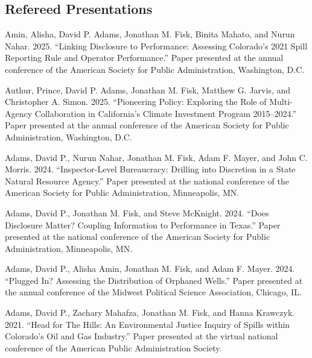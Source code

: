 \documentclass[12pt,letterpaper]{article}
\renewenvironment{itemize}{
  \begin{list}{}{
    \setlength{\leftmargin}{1.5em}
    \setlength{\itemsep}{0.25em}
    \setlength{\parskip}{0pt}
    \setlength{\parsep}{0.25em}
  }
}{
  \end{list}
}
\begin{document}
\subsection*{Refereed Presentations}
	\begin{itemize}\leftmargin=2pt\itemindent=-15pt\leftmargin=2pt\itemindent=-15pt

    \item Amin, Alisha, David P. Adams, Jonathan M. Fisk, Binita Mahato, and Nurun Nahar. 2025. ``Linking Disclosure to Performance: Assessing Colorado's 2021 Spill Reporting Rule and Operator Performance.'' Paper presented at the annual conference of the American Society for Public Administration, Washington, D.C.

    \item Authur, Prince, David P. Adams, Jonathan M. Fisk, Matthew G. Jarvis, and Christopher A. Simon. 2025. ``Pioneering Policy: Exploring the Role of Multi-Agency Collaboration in California's Climate Investment Program 2015--2024.'' Paper presented at the annual conference of the American Society for Public Administration, Washington, D.C.
    
    \item Adams, David P., Nurun Nahar, Jonathan M. Fisk, Adam F. Mayer, and John C. Morris. 2024. ``Inspector-Level Bureaucracy: Drilling into Discretion in a State Natural Resource Agency.'' Paper presented at the national conference of the American Society for Public Administration, Minneapolis, MN.
    
    \item Adams, David P., Jonathan M. Fisk, and Steve McKnight. 2024. ``Does Disclosure Matter? Coupling Information to Performance in Texas.'' Paper presented at the national conference of the American Society for Public Administration, Minneapolis, MN.
    
    \item Adams, David P., Alisha Amin, Jonathan M. Fisk, and Adam F. Mayer. 2024. ``Plugged In? Assessing the Distribution of Orphaned Wells.'' Paper presented at the annual conference of the Midwest Political Science Association, Chicago, IL.
    
    \item Adams, David P., Zachary Mahafza, Jonathan M. Fisk, and Hanna Krawczyk. 2021. ``Head for The Hills: An Environmental Justice Inquiry of Spills within Colorado's Oil and Gas Industry.'' Paper presented at the virtual national conference of the American Public Administration Society.
    

\end{itemize}
\end{document}
